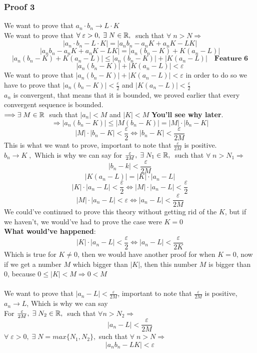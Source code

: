 \subsubsection{Proof 3}
We want to prove that $a_n\cdot b_n\rightarrow L\cdot K$\\
We want to prove that $\forall\; \varepsilon>0,\; \exists\; N\in \mathbb{R},\;$ such that $\forall\; n>N \Longrightarrow$
\[
    |a_n\cdot b_n -L\cdot K|= |a_n b_n-a_nK+a_nK-LK|
\]
\[
    |a_n b_n-a_nK+a_nK-LK| = |a_n(b_n-K)+K(a_n-L)|
\]
\[
    |a_n(b_n-K)+K(a_n-L)|\leq |a_n(b_n-K)|+|K(a_n-L)|\quad \textbf{Feature 6}
\]
\[
    |a_n(b_n-K)|+|K(a_n-L)|<\varepsilon
\]
We want to prove that $|a_n(b_n-K)|+|K(a_n-L)|<\varepsilon$ in order to do so we have to prove that $|a_n(b_n-K)|<\frac{\varepsilon}{2}$ and $|K(a_n-L)|<\frac{\varepsilon}{2}$\\
$a_n$ is convergent, that means that it is bounded, we proved earlier that every convergent sequence is bounded.\\
$\Longrightarrow \exists\; M\in \mathbb{R}\;$ such that $|a_n|<M$ and $|K|<M$ \textbf{You'll see why later}.\\
\[
    \Longrightarrow |a_n(b_n-K)|\leq |M(b_n-K)| = |M|\cdot|b_n-K|
\]
\[
   |M|\cdot|b_n-K|<\frac{\varepsilon}{2} \iff |b_n-K|<\frac{\varepsilon}{2M}
\]
This is what we want to prove, important to note that $\frac{\varepsilon}{2M}$ is positive.\\
$b_n\rightarrow K\;,$ Which is why we can say for $\frac{\varepsilon}{2M},\; \exists\; N_1\in \mathbb{R},\;$ such that $\forall\; n>N_1\Longrightarrow$
\[
    |b_n-k|<\frac{\varepsilon}{2M}
\] 
\[
    |K(a_n-L)|= |K|\cdot |a_n-L|
\]
\[
    |K|\cdot |a_n-L|<\frac{\varepsilon}{2} \iff |M|\cdot|a_n-L|<\frac{\varepsilon}{2}
\]
\[
    |M|\cdot |a_n-L|<\varepsilon \iff |a_n-L|<\frac{\varepsilon}{2M}
\]
We could've continued to prove this theory without getting rid of the $K$, but if we haven't, we would've had to prove the case were $K = 0$\\
\textbf{What would've happened}:\\
\[
    |K|\cdot|a_n-L|<\frac{\varepsilon}{2} \iff |a_n-L|<\frac{\varepsilon}{2K}
\]
Which is true for $K\neq 0$, then we would have another proof for when $K=0$, now if we get a number $M$ which bigger than $|K|$, then this number $M$ is bigger than $0$, because $0\leq|K|<M \Longrightarrow 0<M$\\\\
We want to prove that $|a_n-L|<\frac{\varepsilon}{2M}$, important to note that $\frac{\varepsilon}{2M}$ is positive, $a_n\rightarrow L$, Which is why we can say\\
\noindent For $\frac{\varepsilon}{2M},\; \exists\; N_2\in \mathbb{R},\;$ such that $\forall n>N_2\Longrightarrow$
\[
    |a_n-L|<\frac{\varepsilon}{2M}
\]
$\forall\; \varepsilon>0,\;\exists\; N=max\{N_1,N_2\},$ such that $\forall\; n>N\Longrightarrow$
\[
    |a_nb_n-LK|<\varepsilon
\]

